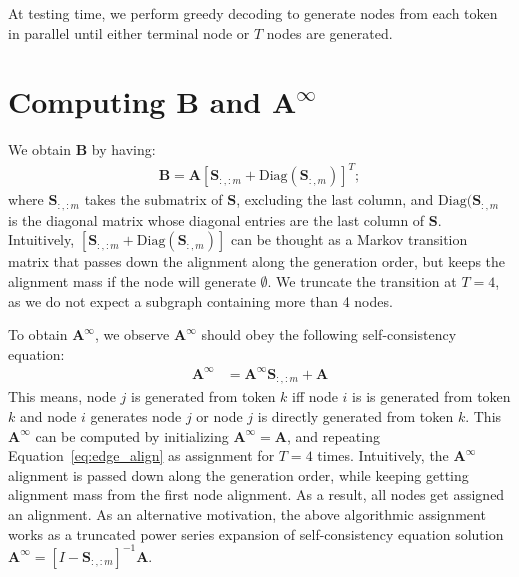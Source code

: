 \documentclass[11pt]{article}
\begin{document}
At testing time, we perform greedy decoding to generate nodes from each token in parallel until either terminal node or $T$ nodes are generated.
\section{Computing $\mathbf{B}$ and $\mathbf{A}^{\infty}$} \label{appendix:align_derivative} 
We obtain $\mathbf{B}$ by having:
\begin{align}
   \mathbf{B} = \mathbf{A} [\mathbf{S}_{:,:m}+\mathrm{Diag}(\mathbf{S}_{:,m})]^T;
\end{align}
where $\mathbf{S}_{:,:m}$ takes the submatrix of  $\mathbf{S}$, excluding the last column, and $\mathrm{Diag}(\mathbf{S}_{:,m}$ is the diagonal matrix whose diagonal entries are the last column of $\mathbf{S}$. Intuitively, $[\mathbf{S}_{:,:m}+\mathrm{Diag}(\mathbf{S}_{:,m})]$ can be thought as a Markov transition matrix that passes down the alignment along the generation order, but keeps the alignment mass if the node will generate $\emptyset$. We truncate the transition at $T=4$, as we do not expect a subgraph containing more than 4 nodes.


To obtain $\mathbf{A}^{\infty}$, we observe $\mathbf{A}^{\infty}$ should obey the following self-consistency equation:
\begin{align}
   \mathbf{A}^{{\infty}} &=  \mathbf{A}^{{\infty}} \mathbf{S}_{:,:m} +  \mathbf{A} \label{eq:edge_align}
\end{align}
This means, node $j$ is generated from token $k$ iff node $i$ is is generated from token $k$ and node $i$ generates node $j$ or node  $j$ is directly generated from token $k$. This $\mathbf{A}^{\infty}$ can be computed  by initializing $ \mathbf{A}^{{\infty}}=\mathbf{A}$, and repeating Equation~\ref{eq:edge_align} as assignment for $T=4$ times. Intuitively, the $ \mathbf{A}^{{\infty}}$ alignment is passed down along the generation order, while keeping getting alignment mass from the first node alignment. As a result, all nodes get assigned an alignment. As an alternative motivation, the above algorithmic assignment works as a truncated power series expansion of self-consistency equation solution $ \mathbf{A}^{{\infty}} = [I-\mathbf{S}_{:,:m}]^{-1}\mathbf{A} $.
\end{document}

